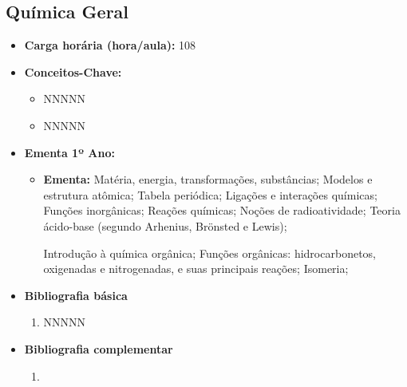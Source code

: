 \documentclass[11pt,fleqn]{book} %
\begin{document}
\subsection{Química Geral}\label{disc:quimica}
\begin{itemize}
	\item \textbf{Carga horária (hora/aula):} 108
	\item \textbf{Conceitos-Chave:}
	\begin{itemize}
		\item NNNNN
		\item NNNNN
	\end{itemize}
	\item \textbf{Ementa 1º Ano:}
	\begin{itemize}	
		\item \textbf{Ementa:} 
		Matéria, energia, transformações, substâncias;
		Modelos e estrutura atômica;
		Tabela periódica;
		Ligações e interações químicas;
		Funções inorgânicas;
		Reações químicas;
		Noções de radioatividade;
		Teoria ácido-base (segundo Arhenius, Brönsted e Lewis);
		
		Introdução à química orgânica;
		Funções orgânicas: hidrocarbonetos, oxigenadas e nitrogenadas, e suas principais reações; 
		Isomeria;
	\end{itemize}
	\item \textbf{Bibliografia básica}
	\begin{enumerate}
		\item NNNNN
	\end{enumerate}
	\item \textbf{Bibliografia complementar}
	\begin{enumerate}
		\item 
	\end{enumerate}	
\end{itemize}
\end{document}
